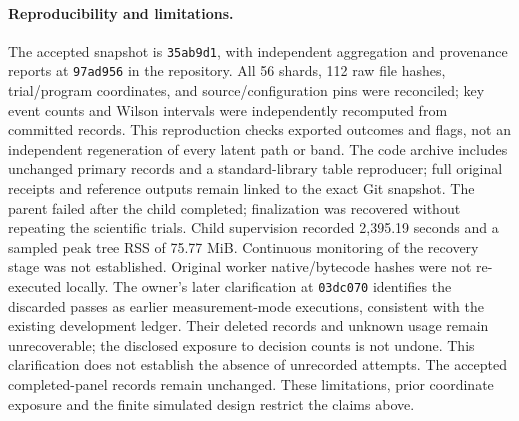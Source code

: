 \paragraph{Reproducibility and limitations.}
The accepted snapshot is \texttt{35ab9d1}, with independent aggregation and
provenance reports at \texttt{97ad956} in the repository. All 56 shards, 112 raw
file hashes, trial/program coordinates, and source/configuration pins were
reconciled; key event counts and Wilson intervals were independently recomputed
from committed records. This reproduction checks exported outcomes and flags,
not an independent regeneration of every latent path or band. The code archive
includes unchanged primary records and a standard-library table reproducer;
full original receipts and reference outputs remain linked to the exact Git snapshot.
The parent failed after the child completed; finalization was recovered without
repeating the scientific trials. Child supervision recorded 2,395.19 seconds and
a sampled peak tree RSS of 75.77 MiB. Continuous monitoring of the recovery stage
was not established. Original worker native/bytecode hashes were not re-executed
locally. The owner's later clarification at \texttt{03dc070} identifies the
discarded passes as earlier measurement-mode executions, consistent with the
existing development ledger. Their deleted records and unknown usage remain
unrecoverable; the disclosed exposure to decision counts is not undone. This
clarification does not establish the absence of unrecorded attempts.
The accepted completed-panel records remain unchanged. These limitations, prior
coordinate exposure and the finite simulated design restrict the claims above.
